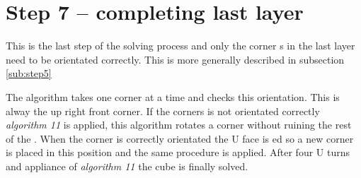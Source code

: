 \section{Step 7 -- completing last layer}
This is the last step of the solving process and only the corner \cpiece{}s in the last layer need to be orientated correctly. This is more generally described in subsection \ref{sub:step5}

The algorithm takes one corner \cpiece{} at a time and checks this orientation. This is alway the up right front corner. If the corners is not orientated correctly \textit{algorithm 11} is applied, this algorithm rotates a corner without ruining the rest of the \cube{}. When the corner is correctly orientated the U face is \twist{}ed so a new corner is placed in this position and the same procedure is applied. After four U turns and appliance of \textit{algorithm 11} the cube is finally solved. 



\begin{comment}
In the last layer the corners in the last layer were poisitend correctly but not oreiented. In this step will the coreners be oreinted correctly and as result it will lead to that the \rubiks{} will be solved.

This step is very simple because it there is only four corners to control and either the corner is oriented correctly or is isn't.  

The program vil first control that the front-right-up corner is oriented correctly if not the will use the an algorithm twice and after the program vil control the corner again if the corner is not oriented correctly his time the use teh algorithme and will continue with this until the corner is oriented correctly. 
Then the corner is orented correctly the program will make at up move ("U") and will control the new corner and the program will do this with every corner in the last layer until they are oriented corectly.  

\end{comment}
